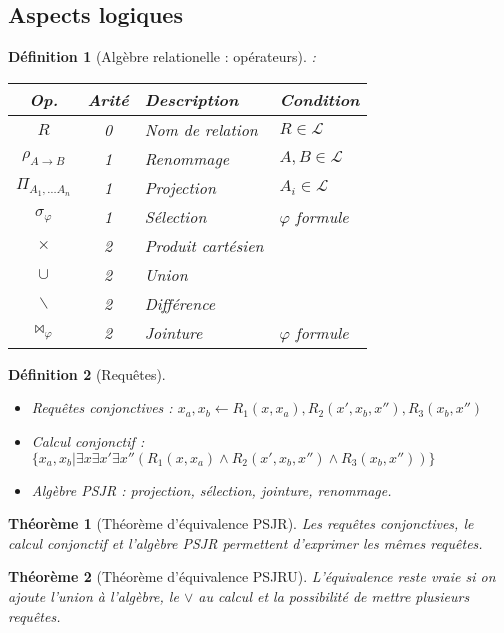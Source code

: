 \documentclass[landscape]{article}
\renewcommand{\L}{\mathscr{L}}
\newcommand{\1}{\mathbbm{1}}
\newcommand{\0}{\mathbbm{0}}
\renewcommand{\phi}{\varphi}
\newtheorem{theo}{Théorème}
\newtheorem{defi}{Définition}
\begin{document}
\begin{multicols}{2}
    \section{Aspects logiques}

    \begin{defi}[Algèbre relationelle : opérateurs]:\\
        \begin{tabular}{ccll}
            \hline
            Op. & Arité & Description & Condition \\
            \hline
            $R$ & 0 & Nom de relation & $R \in \L$ \\
            $\rho_{A\rightarrow B}$ & 1 & Renommage & $A,B\in\L$ \\
            $\Pi_{A_1,\ldots A_n}$ & 1 & Projection & $A_i\in\L$ \\
            $\sigma_\phi$ & 1 & Sélection & $\phi$ formule \\
            $\times$ & 2 & Produit cartésien & \\
            $\cup$ & 2 & Union & \\
            $\backslash$ & 2 & Différence & \\
            $\bowtie_\phi$ & 2 & Jointure & $\phi$ formule \\
            \hline
        \end{tabular}
    \end{defi}

    \begin{defi}[Requêtes] \begin{itemize}
        \item Requêtes conjonctives : $x_a, x_b \leftarrow R_1(x, x_a), R_2(x', x_b, x''), R_3(x_b, x'')$
        \item Calcul conjonctif : $\{x_a, x_b | \exists x \exists x' \exists x''(R_1(x, x_a)\wedge R_2(x', x_b, x'')\wedge R_3(x_b, x'')) \}$
        \item Algèbre PSJR : projection, sélection, jointure, renommage.
    \end{itemize}\end{defi}

    \begin{theo}[Théorème d'équivalence PSJR]
        Les requêtes conjonctives, le calcul conjonctif et l'algèbre PSJR permettent
        d'exprimer les mêmes requêtes.
    \end{theo}

    \begin{theo}[Théorème d'équivalence PSJRU]
        L'équivalence reste vraie si on ajoute l'union à l'algèbre, le $\vee$ au
        calcul et la possibilité de mettre plusieurs requêtes.
    \end{theo}


\end{multicols}
\end{document}
